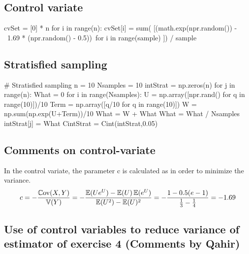 \subsection*{Control variate}
\begin{python}
cvSet = [0] * n
for i in range(n):
    cvSet[i] = sum( [(math.exp(npr.random()) - \
                      1.69 * (npr.random() - 0.5))\
                     for i in range(sample) ]) / sample   
\end{python}

\subsection*{Stratisfied sampling}
\begin{python}
# Stratisfied sampling
n = 10
Nsamples = 10
intStrat = np.zeros(n)
for j in range(n):
    What = 0
    for i in range(Nsamples):
        U = np.array([npr.rand() for q in range(10)])/10
        Term = np.array([q/10 for q in range(10)])
        W = np.sum(np.exp(U+Term))/10
        What = W + What
    What = What / Nsamples
    intStrat[j] = What
CintStrat = Cint(intStrat,0.05)
\end{python}

\subsection*{Comments on control-variate}
In the control variate, the parameter c is calculated as in order to minimize the variance.
\begin{equation}
    c = - \frac{\operatorname{\mathbb{C}\text{ov}}(X, Y)}{\operatorname{\mathbb{V}}(Y)} = - \frac{\operatorname{\mathbb{E}}(Ue^U)-\operatorname{\mathbb{E}}(U)\operatorname{\mathbb{E}}(e^U)}{\operatorname{\mathbb{E}}(U^2)-\operatorname{\mathbb{E}}(U)^2} = -\frac{1-0.5(e-1)}{\frac{1}{3}-\frac{1}{4}} = -1.69
\end{equation}

\subsection*{Use of control variables to reduce variance of estimator of exercise 4 (Comments by Qahir)}

